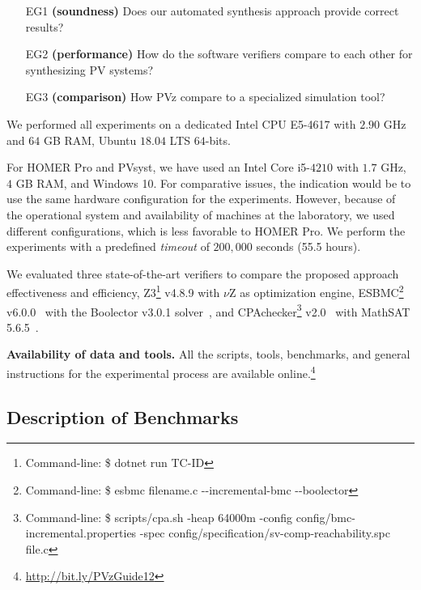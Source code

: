 \documentclass[review]{elsarticle}
\begin{document}
\begin{tcolorbox}
\begin{enumerate}
\item [EG1] \textbf{(soundness)} Does our automated synthesis approach provide correct results?
\item [EG2] \textbf{(performance)} How do the software verifiers compare to each other for synthesizing PV systems?
\item [EG3] \textbf{(comparison)} How PVz compare to a specialized simulation tool?
\end{enumerate}
\end{tcolorbox}

We performed all experiments on a dedicated Intel CPU E5-4617 with $2.90$ GHz and $64$ GB RAM, Ubuntu $18.04$ LTS $64$-bits.

For HOMER Pro and PVsyst, we have used an Intel Core i5-$4210$ with $1.7$ GHz, $4$ GB RAM, and Windows 10. For comparative issues, the indication would be to use the same hardware configuration for the experiments. However, because of the operational system and availability of machines at the laboratory, we used different configurations, which is less favorable to HOMER Pro. We perform the experiments with a predefined \textit{timeout} of $200,000$ seconds (55.5 hours).

We evaluated three state-of-the-art verifiers to compare the proposed approach effectiveness and efficiency, Z3\footnote{Command-line: \$ dotnet run TC-ID} v4.8.9 with $\nu$Z as optimization engine, ESBMC\footnote{Command-line: \$ esbmc filename.c -\phantom{}-incremental-bmc -\phantom{}-boolector} v6.0.0~\citep{esbmc2018} with the Boolector v3.0.1 solver~\citep{Brummayer}, and CPAchecker\footnote{Command-line: \$ scripts/cpa.sh -heap 64000m -config config/bmc-incremental.properties -spec config/specification/sv-comp-reachability.spc file.c} v2.0~\citep{Beyer2011} with MathSAT 5.6.5~\citep{mathsat5}. 

\noindent \textbf{Availability of data and tools.} All the scripts, tools, benchmarks, and general instructions for the experimental process are available online.\footnote{\url{http://bit.ly/PVzGuide12}}

\subsection{Description of Benchmarks}
\end{document}
